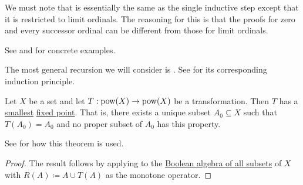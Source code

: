 \begin{remark}
  We must note that  is essentially the same as the single inductive step  except that it is restricted to limit ordinals. The reasoning for this is that the proofs for zero and every successor ordinal can be different from those for limit ordinals.

  See  and  for concrete examples.
\end{remark}

\begin{theorem}\label{thm:structural_recursion}
  The most general recursion we will consider is . See  for its corresponding induction principle.

  Let \( X \) be a set and let \( T: \operatorname{pow}(X) \to \operatorname{pow}(X) \) be a transformation. Then \( T \) has a \hyperref[def:partially_ordered_set_extremal_points/maximum_and_minimum]{smallest} \hyperref[def:fixed_point]{fixed point}. That is, there exists a unique subset \( A_0 \subseteq X \) such that \( T(A_0) = A_0 \) and no proper subset of \( A_0 \) has this property.

  See  for how this theorem is used.
\end{theorem}
\begin{proof}
  The result follows by applying  to the \hyperref[thm:boolean_algebra_of_subsets]{Boolean algebra of all subsets} of \( X \) with \( R(A) \coloneqq A \cup T(A) \) as the monotone operator.
\end{proof}

